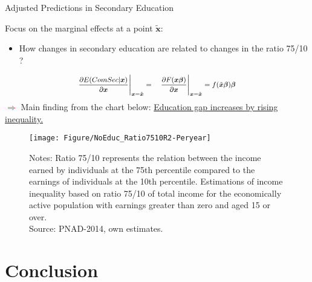 \documentclass{beamer}
\begin{document}
\begin{frame}{Adjusted Predictions in Secondary Education}
\vspace{-0.3cm}
\begin{block}{\centering Focus on the marginal effects at a point $\tilde{\boldsymbol{x}}$:}
\begin{itemize}
\item \footnotesize How changes in secondary education are related to changes in the ratio 75/10 ?
\end{itemize}

\vspace{-0.6cm}
\begin{equation} \label{eq:MaeginalEffect}
\footnotesize \frac{\partial E (ComSec \vert \boldsymbol{x})}{\partial \boldsymbol{x}} \Bigg\vert_{\boldsymbol{x}=\tilde{\boldsymbol{x}}} = \quad \frac{\partial F (\boldsymbol{x} \boldsymbol{\beta})}{\partial \boldsymbol{x}} \Bigg \vert_{\boldsymbol{x}=\tilde{\boldsymbol{x}}}= f(\tilde{\boldsymbol{x}} \boldsymbol{{\beta}}) \boldsymbol{{\beta}} \nonumber 
\end{equation}
\footnotesize \textcolor{red}{$\Longrightarrow$} Main finding from the chart below: \underline{Education gap increases by rising inequality.}

\end{block}


\vspace{-0.2cm}
\begin{figure}[htb]
\centering
\texttt{[image: Figure/NoEduc\_Ratio7510R2-Peryear]}
\begin{minipage}{0.8\textwidth} %
{\fontsize{5}{1}\selectfont 
Notes: Ratio 75/10 represents the relation between the income earned by individuals at the 75th percentile compared to the earnings of individuals at the 10th percentile. Estimations of income inequality based on ratio 75/10 of total income for the economically active population with earnings greater than zero and aged 15 or over. \\ Source: PNAD-2014, own estimates.\par} 
\end{minipage}
\end{figure}
\end{frame}






\section{Conclusion}
\end{document}
